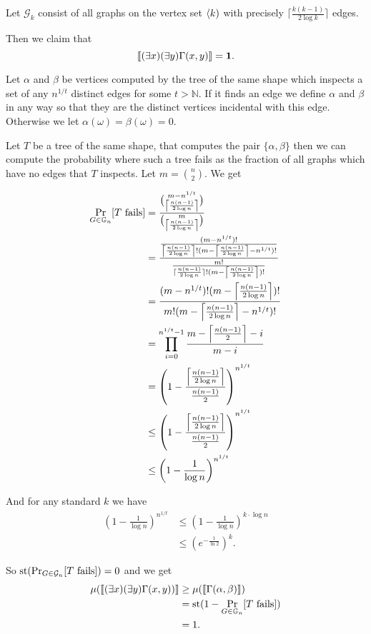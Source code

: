 \begin{exam}\label{examsparseedge}
Let $\mathcal{G}_k$ consist of all graphs on the vertex set $\langle k)$ with precisely $\lceil\frac{k(k-1)}{2\log k}\rceil$ edges.

Then we claim that
\[\llbracket(\exists x)(\exists y)\Gamma(x,y)\rrbracket=\textbf{1}.\]

Let $\alpha$ and $\beta$ be vertices computed by the tree of the same shape which inspects a set of any $n^{1/t}$ distinct edges for some $t>\mathbb{N}$. If it finds an edge we define $\alpha$ and $\beta$ in any way so that they are the distinct vertices incidental with this edge. Otherwise we let $\alpha(\omega)=\beta(\omega)=0$.

Let $T$ be a tree of the same shape, that computes the pair $\{\alpha,\beta\}$ then we can compute the probability where such a tree fails as the fraction of all graphs which have no edges that $T$ inspects. Let $m=\binom{n}{2}$. We get

\begin{align}
\Pr_{G\in\mathbb{G}_n}[T\text{ fails}]&=\frac{\binom{m-n^{1/t}}{\left \lceil { \frac{n(n-1)}{2\log n}} \right \rceil }}{\binom{m}{\left \lceil { \frac{n(n-1)}{2\log n}} \right \rceil}}\\
&=\frac{\frac{(m-n^{1/t})!}{\left \lceil {\frac{n(n-1)}{2\log n}} \right \rceil ! (m-\left \lceil { \frac{n(n-1)}{2\log n}} \right \rceil-n^{1/t})!}}{\frac{m!}{\lceil \frac{n(n-1)}{2\log n}\rceil!(m-\left \lceil {\frac{n(n-1)}{2\log n}} \right \rceil)!}}\\
&=\frac{(m-n^{1/t})!(m-\left \lceil { \frac{n(n-1)}{2\log n}} \right \rceil)!}{m!(m-\left \lceil {\frac{n(n-1)}{2\log n}} \right \rceil-n^{1/t})!}\\
&=\prod_{i=0}^{n^{1/t}-1}\frac{m-\left \lceil {\frac{n(n-1)}{2}} \right \rceil-i}{m-i}\\
&=\left(1-\frac{\left \lceil {\frac{n(n-1)}{2\log n}} \right \rceil}{\frac{n(n-1)}{2}}\right)^{n^{1/t}}\\
&\leq\left(1-\frac{\left \lceil {\frac{n(n-1)}{2\log n}} \right \rceil}{\frac{n(n-1)}{2}}\right)^{n^{1/t}}\\
&\leq\left(1-\frac{1}{\log n}\right)^{n^{1/t}}
\end{align}

And for any standard $k$ we have
\begin{align}
\left(1-\frac{1}{\log n}\right)^{n^{1/t}}&\leq\left(1-\frac{1}{\log n}\right)^{k\cdot \log n}\\
&\leq (e^{-\frac{1}{\ln 2}})^k.
\end{align}

So $\text{st}(\Pr_{G\in\mathcal{G}_n}[T\text{ fails}])=0$ and we get 
\begin{align}
\mu(\llbracket(\exists x)(\exists y)\Gamma(x,y)) \rrbracket &\geq \mu(\llbracket \Gamma(\alpha,\beta)\rrbracket)\\
&=\text{st}(1-\Pr_{G\in\mathbb{G}_n}[T\text{ fails}])\\
&=1.
\end{align}
\end{exam}

